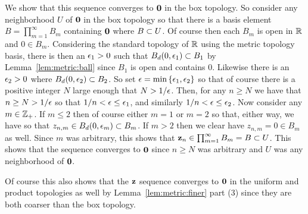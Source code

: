 {{    We show that this sequence converges to $\vze$ in the box topology.
    So consider any neighborhood $U$ of $\vze$ in the box topology so that there is a basis element $B = \prod_{m=1}^\infty B_m$ containing $\vze$ where $B \ss U$.
    Of course then each $B_m$ is open in $\reals$ and $0 \in B_m$.
    Considering the standard topology of $\reals$ using the metric topology basis, there is then an $\e_1 > 0$ such that $B_d(0, \e_1) \ss B_1$ by Lemma~\ref{lem:metric:ball} since $B_1$ is open and contains $0$.
    Likewise there is an $\e_2 > 0$ where $B_d(0, \e_2) \ss B_2$.
    So set $\e = \min\braces{\e_1, \e_2}$ so that of course there is a positive integer $N$ large enough that $N > 1/\e$.
    Then, for any $n \geq N$ we have that $n \geq N > 1/\e$ so that $1/n < \e \leq \e_1$, and similarly $1/n < \e \leq \e_2$.
    Now consider any $m \in \pints$.
    If $m \leq 2$ then of course either $m = 1$ or $m = 2$ so that, either way, we have
    so that $z_{n,m} \in B_d(0, \e_m) \ss B_m$.
    If $m > 2$ then we clear have $z_{n,m} = 0 \in B_m$ as well.
    Since $m$ was arbitrary, this shows that $\vz_n \in \prod_{m=1}^\infty B_m = B \ss U$.
    This shows that the sequence converges to $\vze$ since $n \geq N$ was arbitrary and $U$ was any neighborhood of $\vze$.

    Of course this also shows that the $\vz$ sequence converges to $\vze$ in the uniform and product topologies as well by Lemma~\ref{lem:metric:finer} part (3) since they are both coarser than the box topology.
  }
}

